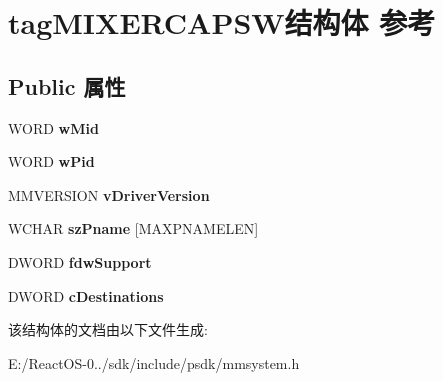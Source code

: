 \hypertarget{structtag_m_i_x_e_r_c_a_p_s_w}{}\section{tag\+M\+I\+X\+E\+R\+C\+A\+P\+S\+W结构体 参考}
\label{structtag_m_i_x_e_r_c_a_p_s_w}
\subsection*{Public 属性}
\begin{DoxyCompactItemize}
\item 
\mbox{\label{structtag_m_i_x_e_r_c_a_p_s_w_ab15b2544d6b38001d84698a62be8df4a}} 
W\+O\+RD {\bfseries w\+Mid}
\item 
\mbox{\label{structtag_m_i_x_e_r_c_a_p_s_w_a8d6876b83ebdad29c6af22728b32faf1}} 
W\+O\+RD {\bfseries w\+Pid}
\item 
\mbox{\label{structtag_m_i_x_e_r_c_a_p_s_w_a8c1159e78d8087a141e96baeffc576b0}} 
M\+M\+V\+E\+R\+S\+I\+ON {\bfseries v\+Driver\+Version}
\item 
\mbox{\label{structtag_m_i_x_e_r_c_a_p_s_w_aab569478e2b63ae416455d8588615d65}} 
W\+C\+H\+AR {\bfseries sz\+Pname} \mbox{[}M\+A\+X\+P\+N\+A\+M\+E\+L\+EN\mbox{]}
\item 
\mbox{\label{structtag_m_i_x_e_r_c_a_p_s_w_a9832c7437121a0c91389ab12ce64bed2}} 
D\+W\+O\+RD {\bfseries fdw\+Support}
\item 
\mbox{\label{structtag_m_i_x_e_r_c_a_p_s_w_a615f7035604ea438b2886f6c1db29132}} 
D\+W\+O\+RD {\bfseries c\+Destinations}
\end{DoxyCompactItemize}


该结构体的文档由以下文件生成\+:\begin{DoxyCompactItemize}
\item 
E\+:/\+React\+O\+S-\/0../sdk/include/psdk/mmsystem.\+h\end{DoxyCompactItemize}
